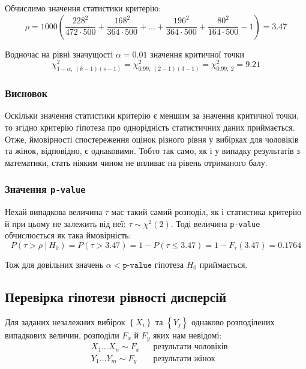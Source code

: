 Обчислимо значення статистики критерію:
\begin{equation*}
    \rho = 1000\left( \frac{228^2}{472\cdot 500}+\frac{168^2}{364\cdot 500} + \ldots + 
    \frac{196^2}{364\cdot 500}+\frac{80^2}{164\cdot 500} - 1 \right) = 3.47
\end{equation*}

Водночас на рівні значущості $\alpha=0.01$ значення критичної точки
\begin{equation*} 
    \chi^2_{1-\alpha;\ (k-1)(s-1)}=\chi^2_{0.99;\ (2-1)(3-1)}=\chi^2_{0.99;\ 2}=9.21
\end{equation*}

\subsubsection{Висновок}

Оскільки значення статистики критерію є меншим за значення критичної точки, то згідно критерію гіпотеза 
про однорідність статистичних даних приймається. Отже, ймовірності спостереження оцінок різного рівня у 
вибірках для чоловіків та жінок, відповідно, є однаковими. Тобто так само, як і у випадку результатів з 
математики, стать ніяким чином не впливає на рівень отриманого балу.

\subsubsection*{Значення \texttt{p-value}}

Нехай випадкова величина $\tau$ має такий самий розподіл, як і статистика критерію й при цьому не залежить 
від неї: $\tau\sim\chi^2(2)$. Тоді величина \texttt{p-value} обчислюється як така ймовірність:
\[ P(\tau>\rho\ |\ H_0)=P(\tau>3.47)=1-P(\tau\leqslant3.47)=1-F_{\tau}(3.47)=0.1764 \]

Тож для довільних значень $\alpha<\texttt{p-value}$ гіпотеза $H_0$ приймається.

\subsection{Перевірка гіпотези рівності дисперсій}

Для заданих незалежних вибірок $\left\{ X_i \right\}$ та $\left\{ Y_j \right\}$ 
однаково розподілених випадкових величин, розподіли $F_x$ й $F_y$ яких нам невідомі:
\begin{align*}
    &X_1 \ldots X_n\sim F_x && \text{результати чоловіків} \\
    &Y_1 \ldots Y_m\sim F_y && \text{результати жінок}
\end{align*}

